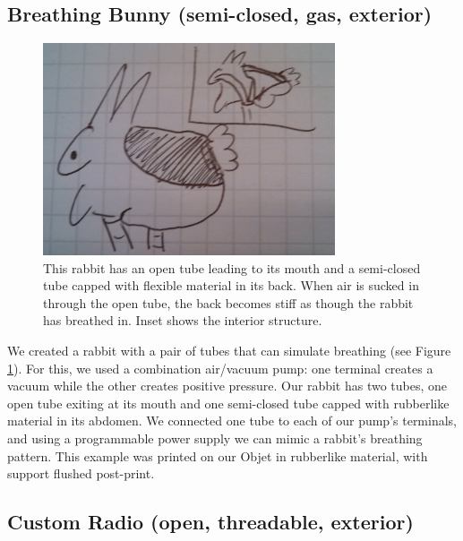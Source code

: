 \subsection{Breathing Bunny (semi-closed, gas, exterior)}

\begin{figure}[h]
\centering
    \includegraphics[width=3.4in]{figures/placeholder/bunny.jpg}
\caption{This rabbit has an open tube leading to its mouth and a semi-closed tube capped with flexible material in its back.  When air is sucked in through the open tube, the back becomes stiff as though the rabbit has breathed in.  Inset shows the interior structure.}
\label{fig:breathe}
\end{figure}

We created a rabbit with a pair of tubes that can simulate breathing (see Figure \ref{fig:breathe}).  For this, we used a combination air/vacuum pump: one terminal creates a vacuum while the other creates positive pressure.  Our rabbit has two tubes, one open tube exiting at its mouth and one semi-closed tube capped with rubberlike material in its abdomen.  We connected one tube to each of our pump's terminals, and using a programmable power supply we can mimic a rabbit's breathing pattern.  This example was printed on our Objet in rubberlike material, with support flushed post-print. 

\subsection{Custom Radio (open, threadable, exterior)}

